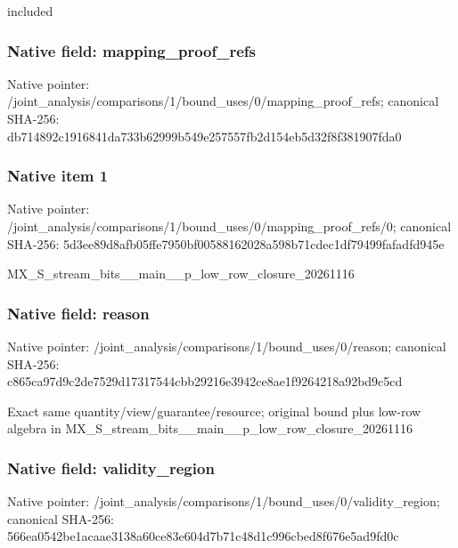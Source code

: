 \documentclass[10pt,a4paper]{article}
\begin{document}
\begingroup\raggedright\sloppy included\par\endgroup

\subsubsection{Native field: mapping\_\allowbreak{}proof\_\allowbreak{}refs}
Native pointer: /joint\_\allowbreak{}analysis/comparisons/1/bound\_\allowbreak{}uses/0/mapping\_\allowbreak{}proof\_\allowbreak{}refs; canonical SHA-256: db714892c1916841da733b62999b549e257557fb2d154eb5d32f8f381907fda0

\subsubsection{Native item 1}
Native pointer: /joint\_\allowbreak{}analysis/comparisons/1/bound\_\allowbreak{}uses/0/mapping\_\allowbreak{}proof\_\allowbreak{}refs/0; canonical SHA-256: 5d3ee89d8afb05ffe7950bf00588162028a598b71cdec1df79499fafadfd945e

\begingroup\raggedright\sloppy MX\_\allowbreak{}S\_\allowbreak{}stream\_\allowbreak{}bits\_\allowbreak{}\_\allowbreak{}main\_\allowbreak{}\_\allowbreak{}p\_\allowbreak{}low\_\allowbreak{}row\_\allowbreak{}closure\_\allowbreak{}20261116\par\endgroup

\subsubsection{Native field: reason}
Native pointer: /joint\_\allowbreak{}analysis/comparisons/1/bound\_\allowbreak{}uses/0/reason; canonical SHA-256: c865ca97d9c2de7529d17317544cbb29216e3942ce8ae1f9264218a92bd9c5cd

\begingroup\raggedright\sloppy Exact same quantity/\allowbreak{}view/\allowbreak{}guarantee/\allowbreak{}resource;\allowbreak{} original bound plus low-row algebra in MX\_\allowbreak{}S\_\allowbreak{}stream\_\allowbreak{}bits\_\allowbreak{}\_\allowbreak{}main\_\allowbreak{}\_\allowbreak{}p\_\allowbreak{}low\_\allowbreak{}row\_\allowbreak{}closure\_\allowbreak{}20261116\par\endgroup

\subsubsection{Native field: validity\_\allowbreak{}region}
Native pointer: /joint\_\allowbreak{}analysis/comparisons/1/bound\_\allowbreak{}uses/0/validity\_\allowbreak{}region; canonical SHA-256: 566ea0542be1acaae3138a60ce83e604d7b71c48d1c996cbed8f676e5ad9fd0c
\end{document}
